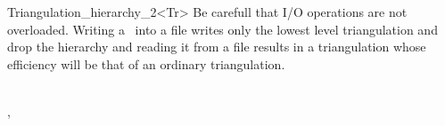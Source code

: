 \begin{ccRefClass}{Triangulation_hierarchy_2<Tr>}
Be carefull that I/O operations are not overloaded.
Writing a \ccRefName\  into a file
writes only the lowest level triangulation and drop the hierarchy
and reading it from a file results in a triangulation
whose efficiency will be that of an ordinary triangulation.


\ccSeeAlso
{} \\
, \\


\end{ccRefClass}


